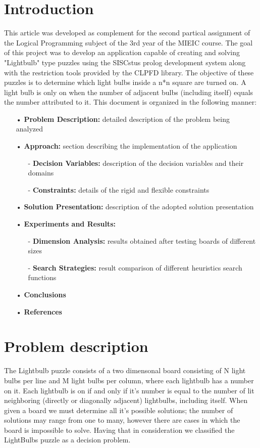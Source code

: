 \documentclass[runningheads]{llncs}
\begin{document}
\section{Introduction}
This article was developed as complement for the second partical assignment of the Logical Programming subject of the 3rd year of the MIEIC course. The goal of this project was to develop an application capable of creating and solving "Lightbulb" type puzzles using the SISCstus prolog development system along with the restriction tools provided by the CLPFD library. The objective of these puzzles is to determine which light bulbs inside a n*n square are turned on. A light bulb is only on when the number of adjacent bulbs (including itself) equals the number attributed to it. This document is organized in the following manner:
	\begin{itemize}
		\item[•] \textbf{Problem Description:} detailed description of the problem being analyzed
		\item[•] \textbf{Approach:} section describing the implementation of the application
		\begin{itemize}
			\item[-] \textbf{Decision Variables:} description of the decision variables and their domains
			\item[-] \textbf{Constraints:} details of the rigid and flexible constraints
		\end{itemize}
		\item[•] \textbf{Solution Presentation:} description of the adopted solution presentation
		\item[•] \textbf{Experiments and Results:}
		\begin{itemize}
			\item[-] \textbf{Dimension Analysis:} results obtained after testing boards of different sizes
			\item[-] \textbf{Search Strategies:} result comparison of different heuristics search functions
		\end{itemize}
		\item[•] \textbf{Conclusions}
		\item[•] \textbf{References}
	\end{itemize}

\section{Problem description}
The Lightbulb puzzle consists of a two dimensonal board consisting of N light bulbs per line and M light bulbs per column, where each lightbulb has a number on it.\hfill \break
Each lightbulb is on if and only if it's number is equal to the number of lit neighboring (directly or diagonally adjacent) lightbulbs, including itself. When given a board we must determine all it's possible solutions; the number of solutions may range from one to many, however there are cases in which the board is impossible to solve. Having that in consideration we classified the LightBulbs puzzle as a decision problem.
\end{document}
